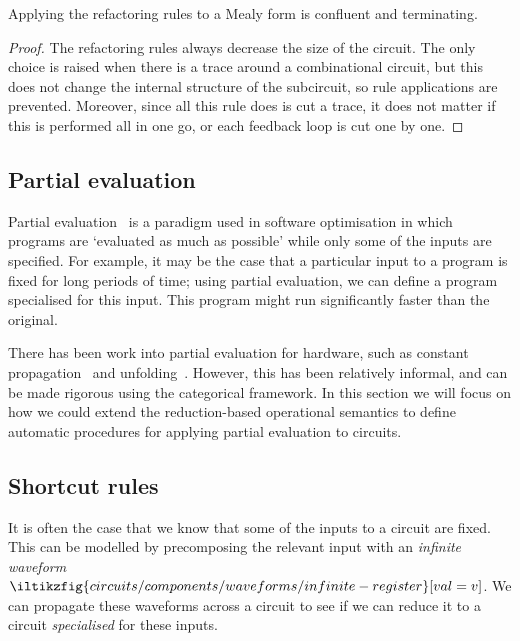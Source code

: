 \documentclass{lmcs}
\begin{document}
\begin{prop}
    Applying the refactoring rules to a Mealy form is confluent and
    terminating.
\end{prop}
\begin{proof}
    The refactoring rules always decrease the size of the circuit.
    The only choice is raised when there is a trace around a combinational
    circuit, but this does not change the internal structure of the subcircuit,
    so rule applications are prevented.
    Moreover, since all this rule does is cut a trace, it does not matter if
    this is performed all in one go, or each feedback loop is cut one by one.
\end{proof}

\subsection{Partial evaluation}\label{sec:partial}

Partial evaluation~\cite{jones1996introduction} is a paradigm used in software
optimisation in which programs are `evaluated as much as possible' while only
some of the inputs are specified.
For example, it may be the case that a particular input to a program is fixed
for long periods of time; using partial evaluation, we can define a program
specialised for this input.
This program might run significantly faster than the original.

There has been work into partial evaluation for hardware, such as constant
propagation~\cite{singh1996expressing,singh1999partial} and
unfolding~\cite{thompson2006bitlevel}.
However, this has been relatively informal, and can be made rigorous using the
categorical framework.
In this section we will focus on how we could extend the reduction-based
operational semantics to define automatic procedures for applying partial
evaluation to circuits.

\subsection{Shortcut rules}\label{sec:shortcut}

It is often the case that we know that some of the inputs to a circuit are
fixed.
This can be modelled by precomposing the relevant input with an
\emph{infinite waveform} \(
\iltikzfig{circuits/components/waveforms/infinite-register}[val=v]
\).
We can propagate these waveforms across a circuit to see if we can reduce it to
a circuit \emph{specialised} for these inputs.
\end{document}
